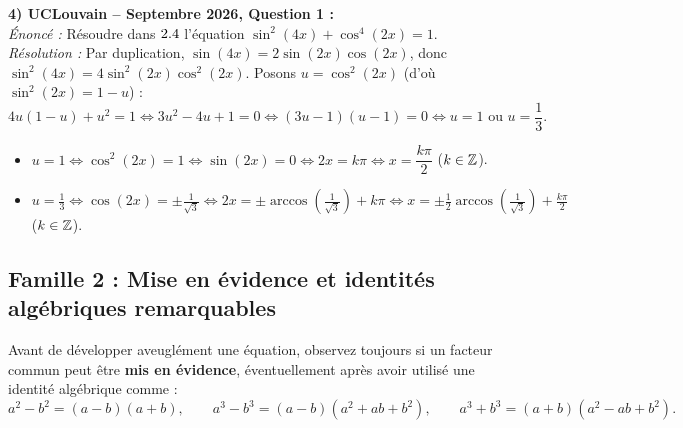 \begin{exemple}
\medskip
\textbf{4) UCLouvain -- Septembre 2026, Question 1 :}\\
\emph{Énoncé :} Résoudre dans $2.4$ l'équation $\sin^2(4x) + \cos^4(2x) = 1$.\\
\emph{Résolution :} Par duplication, $\sin(4x) = 2\sin(2x)\cos(2x)$, donc $\sin^2(4x) = 4\sin^2(2x)\cos^2(2x)$. Posons $u = \cos^2(2x)$ (d'où $\sin^2(2x) = 1 - u$) :
\[
    4u(1-u) + u^2 = 1 \iff 3u^2 - 4u + 1 = 0 \iff (3u - 1)(u - 1) = 0 \iff u = 1 \text{ ou } u = \frac{1}{3}.
\]
\begin{itemize}
    \item $u = 1 \iff \cos^2(2x) = 1 \iff \sin(2x) = 0 \iff 2x = k\pi \iff x = \dfrac{k\pi}{2}$ ($k \in \mathbb{Z}$).
    \item $u = \frac{1}{3} \iff \cos(2x) = \pm\frac{1}{\sqrt{3}} \iff 2x = \pm\arccos\left(\frac{1}{\sqrt{3}}\right) + k\pi \iff x = \pm\frac{1}{2}\arccos\left(\frac{1}{\sqrt{3}}\right) + \frac{k\pi}{2}$ ($k \in \mathbb{Z}$).
\end{itemize}
\end{exemple}

\subsection{Famille 2 : Mise en évidence et identités algébriques remarquables}

Avant de développer aveuglément une équation, observez toujours si un facteur commun peut être \textbf{mis en évidence}, éventuellement après avoir utilisé une identité algébrique comme :
\[
    a^2 - b^2 = (a-b)(a+b), \qquad a^3 - b^3 = (a-b)(a^2 + ab + b^2), \qquad a^3 + b^3 = (a+b)(a^2 - ab + b^2).
\]

